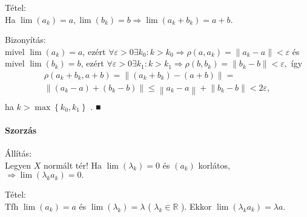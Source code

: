 \documentclass[]{scrartcl}
\let\oldparagraph\paragraph
\renewcommand{\paragraph}[1]{\oldparagraph{#1}\mbox{}}
\newenvironment{tetel}{}{}
\newenvironment{bizonyitas}{}{}
\newenvironment{allitas}{}{}
\begin{document}
\begin{tetel}

Tétel:\\
Ha
\(\left. \lim\left( a_{k} \right) = a,\lim\left( b_{k} \right) = b\Rightarrow\lim\left( {a_{k} + b_{k}} \right) = a + b \right.\).

\end{tetel}

\begin{bizonyitas}

Bizonyítás:\\
mivel \(\lim\left( a_{k} \right) = a\), ezért
\(\left. \forall\varepsilon > 0\exists k_{0}:k > k_{0}\Rightarrow\rho\left( {a,a_{k}} \right) = \left\| {a_{k} - a} \parallel \right. < \varepsilon \right.\)
és mivel \(\lim\left( b_{k} \right) = b\), ezért
\(\left. \forall\varepsilon > 0\exists k_{1}:k > k_{1}\Rightarrow\rho\left( {b,b_{k}} \right) = \left\| {b_{k} - b} \parallel \right. < \varepsilon \right.,\)
így \[\begin{array}{l}
{\rho\left( {a_{k} + b_{k},a + b} \right) = \left\| {\left( {a_{k} + b_{k}} \right) - \left( {a + b} \right)} \right\| =} \\
{\left\| {\left( {a_{k} - a} \right) + \left( {b_{k} - b} \right)} \right\| \leq \left\| {a_{k} - a} \right\| + \left\| {b_{k} - b} \right\| < 2\varepsilon,} \\
\end{array}\] ha \(k > \max\left\{ {k_{0},k_{1}} \right\}\) . ■

\end{bizonyitas}

\paragraph{Szorzás}\label{szorzas}

\begin{allitas}

Állítás:\\
Legyen \(X\) normált tér! Ha \(\lim\left( \lambda_{k} \right) = 0\) és
\(\left( a_{k} \right)\) korlátos,
\(\left. \Rightarrow\lim\left( {\lambda_{k}a_{k}} \right) = 0 \right..\)

\end{allitas}

\begin{tetel}

Tétel:\\
Tfh \(\lim\left( a_{k} \right) = a\) és
\(\lim\left( \lambda_{k} \right) = \lambda\) (
\(\lambda_{k} \in {\mathbb{R}}\) ). Ekkor
\(\lim\left( {\lambda_{k}a_{k}} \right) = \lambda a\).

\end{tetel}
\end{document}
